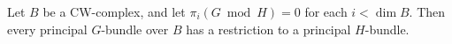 Let $B$ be a CW-complex, and let $\pi_i(G \bmod H) = 0$ for each $i < \dim B$. Then every principal $G$-bundle over $B$ has a restriction to a principal $H$-bundle.

